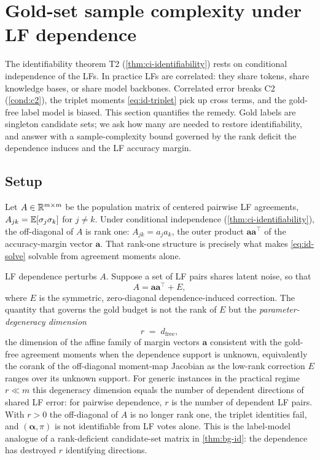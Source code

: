 \section{Gold-set sample complexity under LF dependence}
\label{sec:methodology}

The identifiability theorem T2 (\cref{thm:ci-identifiability}) rests
on conditional independence of the LFs. In practice LFs are
correlated: they share tokens, share knowledge bases, or share model
backbones. Correlated error breaks C2 (\cref{cond:c2}), the triplet
moments \eqref{eq:id-triplet} pick up cross terms, and the gold-free
label model is biased. This section quantifies the remedy. Gold
labels are singleton candidate sets; we ask how many are needed to
restore identifiability, and answer with a sample-complexity bound
governed by the rank deficit the dependence induces and the LF
accuracy margin.

\subsection{Setup}

Let $A \in \mathbb{R}^{m \times m}$ be the population matrix of centered
pairwise LF agreements, $A_{jk} = \mathbb{E}[\sigma_j \sigma_k]$ for $j \neq
k$. Under conditional independence (\cref{thm:ci-identifiability}),
the off-diagonal of $A$ is rank one: $A_{jk} = a_j a_k$, the outer
product $\bm{a}\bm{a}^\top$ of the accuracy-margin vector $\bm{a}$.
That rank-one structure is precisely what makes
\eqref{eq:id-solve} solvable from agreement moments alone.

LF dependence perturbs $A$. Suppose a set of LF pairs shares latent
noise, so that
\begin{equation}
  A = \bm{a}\bm{a}^\top + E,
  \label{eq:meth-decomp}
\end{equation}
where $E$ is the symmetric, zero-diagonal dependence-induced
correction. The quantity that governs the gold budget is not the rank
of $E$ but the \emph{parameter-degeneracy dimension}
\begin{equation}
  r \;=\; d_{\mathrm{free}},
  \label{eq:meth-dfree}
\end{equation}
the dimension of the affine family of margin vectors $\bm{a}$
consistent with the gold-free agreement moments when the dependence
support is unknown, equivalently the corank of the off-diagonal
moment-map Jacobian as the low-rank correction $E$ ranges over its
unknown support. For generic instances in the practical regime
$r \ll m$ this degeneracy dimension equals the number of dependent
directions of shared LF error: for pairwise dependence, $r$ is the
number of dependent LF pairs. With $r > 0$ the off-diagonal of $A$ is
no longer rank one, the triplet identities fail, and $(\bm{\alpha},
\pi)$ is not identifiable from LF votes alone. This is the label-model
analogue of a rank-deficient candidate-set matrix in \cref{thm:bg-id}:
the dependence has destroyed $r$ identifying directions.

